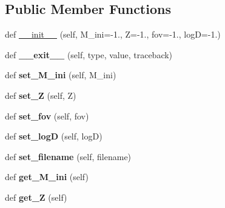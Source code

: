 \subsection*{Public Member Functions}
\begin{DoxyCompactItemize}
\item 
def \hyperlink{classasamba_1_1var__def_1_1track_a4b2441ffcfecbec92fb57d7d57aa3939}{\+\_\+\+\_\+init\+\_\+\+\_\+} (self, M\+\_\+ini=-\/1., Z=-\/1., fov=-\/1., logD=-\/1.)
\item 
\mbox{\label{classasamba_1_1var__def_1_1track_aed957132df7a7e728252aad31b93ea67}} 
def {\bfseries \+\_\+\+\_\+exit\+\_\+\+\_\+} (self, type, value, traceback)
\item 
\mbox{\label{classasamba_1_1var__def_1_1track_a5f46732cb3a31e15e2aed17688a403ea}} 
def {\bfseries set\+\_\+\+M\+\_\+ini} (self, M\+\_\+ini)
\item 
\mbox{\label{classasamba_1_1var__def_1_1track_ad70395a3e579d489e6234232629e341f}} 
def {\bfseries set\+\_\+Z} (self, Z)
\item 
\mbox{\label{classasamba_1_1var__def_1_1track_a26354c8dfd8dc3ee2cc1557ad1ab299d}} 
def {\bfseries set\+\_\+fov} (self, fov)
\item 
\mbox{\label{classasamba_1_1var__def_1_1track_a62f1ee4781b07e529f159ad292f199a9}} 
def {\bfseries set\+\_\+logD} (self, logD)
\item 
\mbox{\label{classasamba_1_1var__def_1_1track_aac1969da3c80cef07dac95d9d19a5267}} 
def {\bfseries set\+\_\+filename} (self, filename)
\item 
\mbox{\label{classasamba_1_1var__def_1_1track_ac30f57980f1f11f3d986e3dcb654d0c3}} 
def {\bfseries get\+\_\+\+M\+\_\+ini} (self)
\item 
\mbox{\label{classasamba_1_1var__def_1_1track_a18150ada4b8ce715f9bbb56434fdf83e}} 
def {\bfseries get\+\_\+Z} (self)
\item 

\end{DoxyCompactItemize}

